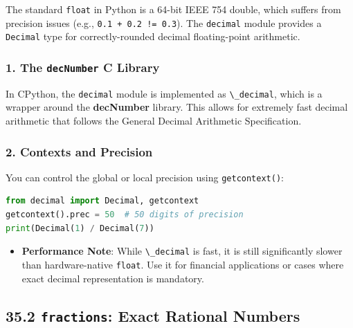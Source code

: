 The standard \passthrough{\lstinline!float!} in Python is a 64-bit IEEE
754 double, which suffers from precision issues (e.g.,
\passthrough{\lstinline"0.1 + 0.2 != 0.3"}). The
\passthrough{\lstinline!decimal!} module provides a
\passthrough{\lstinline!Decimal!} type for correctly-rounded decimal
floating-point arithmetic.

\hypertarget{the-decnumber-c-library}{%
\subsubsection{\texorpdfstring{1. The \texttt{decNumber} C
Library}{1. The decNumber C Library}}\label{the-decnumber-c-library}}

In CPython, the \passthrough{\lstinline!decimal!} module is implemented
as \passthrough{\lstinline!\_decimal!}, which is a wrapper around the
\textbf{decNumber} library. This allows for extremely fast decimal
arithmetic that follows the General Decimal Arithmetic Specification.

\hypertarget{contexts-and-precision}{%
\subsubsection{2. Contexts and Precision}\label{contexts-and-precision}}

You can control the global or local precision using
\passthrough{\lstinline!getcontext()!}:

\begin{lstlisting}[language=Python]
from decimal import Decimal, getcontext
getcontext().prec = 50  # 50 digits of precision
print(Decimal(1) / Decimal(7))
\end{lstlisting}

\begin{itemize}
\tightlist
\item
  \textbf{Performance Note}: While \passthrough{\lstinline!\_decimal!}
  is fast, it is still significantly slower than hardware-native
  \passthrough{\lstinline!float!}. Use it for financial applications or
  cases where exact decimal representation is mandatory.
\end{itemize}

\hypertarget{fractions-exact-rational-numbers}{%
\subsection{\texorpdfstring{35.2 \texttt{fractions}: Exact Rational
Numbers}{35.2 fractions: Exact Rational Numbers}}\label{fractions-exact-rational-numbers}}

